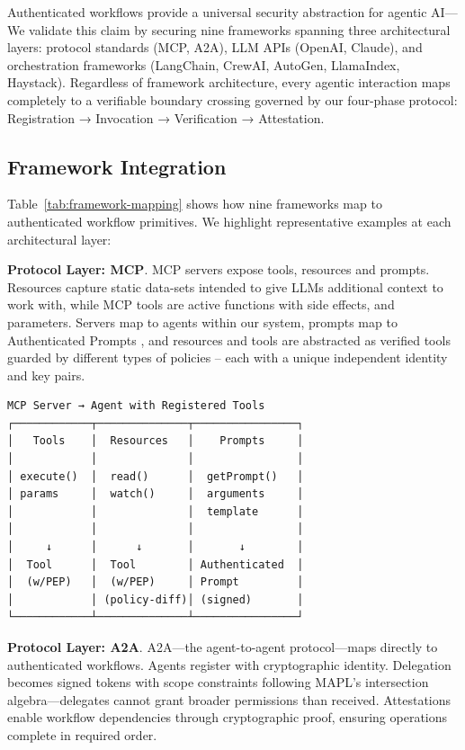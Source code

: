 Authenticated workflows provide a universal security abstraction for agentic AI—
We validate this claim by securing nine frameworks spanning three architectural layers: protocol standards (MCP, A2A), LLM APIs (OpenAI, Claude), and orchestration frameworks (LangChain, CrewAI, AutoGen, LlamaIndex, Haystack). 
Regardless of framework architecture, every agentic interaction maps completely to a verifiable boundary crossing governed by our four-phase protocol: Registration → Invocation → Verification → Attestation.

\subsection{Framework Integration}
Table~\ref{tab:framework-mapping} shows how nine frameworks map to authenticated workflow primitives. We highlight representative examples at each architectural layer:


\textbf{Protocol Layer: MCP}.
MCP servers expose tools, resources and prompts.
Resources capture static data-sets intended to give LLMs additional context to work with, while MCP tools are active functions with side effects, and parameters.
Servers map to agents within our system, prompts map to Authenticated Prompts \cite{rajagopalan2025prompts}, and resources and tools are abstracted as verified tools guarded by different types of policies  --  each with a unique independent identity and key pairs.

\noindent\begin{minipage}[t]{\columnwidth}
{\scriptsize
\begin{verbatim}
MCP Server → Agent with Registered Tools
┌────────────┬──────────────┬────────────────┐
│   Tools    │  Resources   │    Prompts     │
│            │              │                │
│ execute()  │  read()      │  getPrompt()   │
│ params     │  watch()     │  arguments     │
│            │              │  template      │
│            │              │                │
│     ↓      │      ↓       │       ↓        │
│  Tool      │  Tool        │ Authenticated  │
│  (w/PEP)   │  (w/PEP)     │ Prompt         │
│            │ (policy-diff)│ (signed)       │
└────────────┴──────────────┴────────────────┘
\end{verbatim}}
\end{minipage}


\textbf{Protocol Layer: A2A}. A2A—the agent-to-agent protocol—maps directly to authenticated workflows. Agents register with cryptographic identity. Delegation becomes signed tokens with scope constraints following MAPL's intersection algebra—delegates cannot grant broader permissions than received. Attestations enable workflow dependencies through cryptographic proof, ensuring operations complete in required order.

